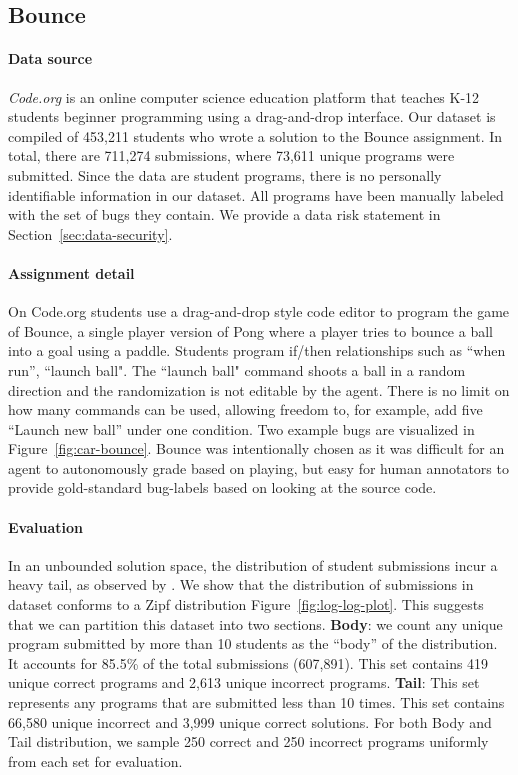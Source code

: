 \documentclass{article}
\newcommand{\EDIT}[1]{#1}%
\newcommand{\PIECH}[1]{#1}%
\begin{document}
\subsection{Bounce}
\label{sec:bounce-exp}
\vspace{-2mm} 



\paragraph{Data source}
\textit{Code.org} is an online computer science education platform that teaches \EDIT{K-12 students} beginner programming \EDIT{using} a drag-and-drop interface.
Our dataset is compiled \EDIT{of} 453,211 students \EDIT{who wrote a solution to the Bounce assignment.} In total, there are 711,274 submissions, where 73,611 unique programs were submitted. Since the data are student programs, there is no personally identifiable information in our dataset. \EDIT{All programs have been manually labeled with the set of bugs they contain.} \EDIT{We provide a data risk statement in Section~\ref{sec:data-security}.} 

\paragraph{Assignment detail} On Code.org students use a drag-and-drop style code editor to program the game of \EDIT{Bounce, a single player version of Pong where a player tries to bounce a ball into a goal using a paddle.}  
\EDIT{Students program if/then relationships such as ``when run'', ``launch ball". The ``launch ball" command shoots a ball in a random direction and the randomization is not editable by the agent.} %
There is no limit on how many commands can be used, allowing freedom to, for example, add five ``Launch new ball'' under one condition.  Two example bugs are visualized in Figure~\ref{fig:car-bounce}. \PIECH{Bounce was intentionally chosen as it was difficult for an agent to autonomously grade based on playing, but easy for human annotators to provide gold-standard bug-labels based on looking at the source code.}


\paragraph{Evaluation}
In an unbounded solution space, the distribution of student submissions incur a heavy tail, as observed by \cite{wu2019zero}. We show that the distribution of submissions in dataset conforms to a Zipf distribution Figure~\ref{fig:log-log-plot}. This suggests that we can partition this dataset into two sections.
\textbf{Body}: we count any unique program submitted by more than 10 students as the ``body'' of the distribution. It accounts for 85.5\% of the total submissions (607,891). This set contains 419 unique correct programs and 2,613 unique incorrect programs. %
\textbf{Tail}: This set represents any programs that are submitted less than 10 times. This set contains 66,580 unique incorrect and 3,999 unique correct solutions.
For both Body and Tail distribution, we sample 250 correct and 250 incorrect programs uniformly from each set for evaluation.
\end{document}
